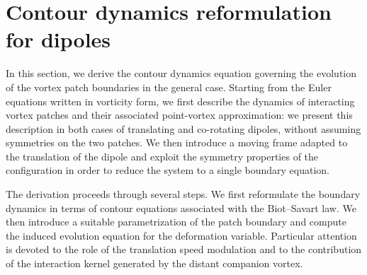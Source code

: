 \documentclass[a4paper,reqno,10pt]{article}
\begin{document}
\section{Contour dynamics reformulation for  dipoles}\label{model.derivation}


In this section, we derive the contour dynamics equation governing the evolution of the vortex patch boundaries in the general case. Starting from the Euler equations written in vorticity form, we first describe the dynamics of interacting vortex patches and their associated point-vortex approximation: we present this description in both cases of translating and co-rotating dipoles, without assuming symmetries on the two patches. We then introduce a moving frame adapted to the translation of the dipole and exploit the symmetry properties of the configuration in order to reduce the system to a single boundary equation.

The derivation proceeds through several steps. We first reformulate the boundary dynamics in terms of contour equations associated with the Biot--Savart law. We then introduce a suitable parametrization of the patch boundary and compute the induced evolution equation for the deformation variable. Particular attention is devoted to the role of the translation speed modulation and to the contribution of the interaction kernel generated by the distant companion vortex.
\end{document}
